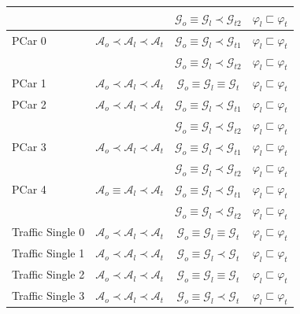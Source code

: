 \begin{table}[h]
\begin{tabular*}{\linewidth}{@{\extracolsep{\fill}}lccc@{}}
 & & $\mathcal{G}_{o}\equiv\mathcal{G}_{l}\prec\mathcal{G}_{t2}$ & $\varphi_l\sqsubset \varphi_t$ \\
\hline
PCar 0 & $\mathcal{A}_{o}\prec\mathcal{A}_{l}\prec\mathcal{A}_{t}$ & $\mathcal{G}_{o}\equiv\mathcal{G}_{l}\prec\mathcal{G}_{t1}$ & $\varphi_l\sqsubset \varphi_t$ \\
 & & $\mathcal{G}_{o}\equiv\mathcal{G}_{l}\prec\mathcal{G}_{t2}$ & $\varphi_l\sqsubset \varphi_t$ \\
PCar 1 & $\mathcal{A}_{o}\prec\mathcal{A}_{l}\prec\mathcal{A}_{t}$ & $\mathcal{G}_{o}\equiv\mathcal{G}_{l}\equiv\mathcal{G}_{t}$ & $\varphi_l\sqsubset \varphi_t$ \\
PCar 2 & $\mathcal{A}_{o}\prec\mathcal{A}_{l}\prec\mathcal{A}_{t}$ & $\mathcal{G}_{o}\equiv\mathcal{G}_{l}\prec\mathcal{G}_{t1}$ & $\varphi_l\sqsubset \varphi_t$ \\
 & & $\mathcal{G}_{o}\equiv\mathcal{G}_{l}\prec\mathcal{G}_{t2}$ & $\varphi_l\sqsubset \varphi_t$ \\
PCar 3 & $\mathcal{A}_{o}\prec\mathcal{A}_{l}\prec\mathcal{A}_{t}$ & $\mathcal{G}_{o}\equiv\mathcal{G}_{l}\prec\mathcal{G}_{t1}$ & $\varphi_l\sqsubset \varphi_t$ \\
 & & $\mathcal{G}_{o}\equiv\mathcal{G}_{l}\prec\mathcal{G}_{t2}$ & $\varphi_l\sqsubset \varphi_t$ \\
PCar 4 & $\mathcal{A}_{o}\equiv\mathcal{A}_{l}\prec\mathcal{A}_{t}$ & $\mathcal{G}_{o}\equiv\mathcal{G}_{l}\prec\mathcal{G}_{t1}$ & $\varphi_l\sqsubset \varphi_t$ \\
 & & $\mathcal{G}_{o}\equiv\mathcal{G}_{l}\prec\mathcal{G}_{t2}$ & $\varphi_l\sqsubset \varphi_t$ \\
\hline
Traffic Single 0 & $\mathcal{A}_{o}\prec\mathcal{A}_{l}\prec\mathcal{A}_{t}$ & $\mathcal{G}_{o}\equiv\mathcal{G}_{l}\equiv\mathcal{G}_{t}$ & $\varphi_l\sqsubset \varphi_t$ \\
Traffic Single 1 & $\mathcal{A}_{o}\prec\mathcal{A}_{l}\prec\mathcal{A}_{t}$ & $\mathcal{G}_{o}\equiv\mathcal{G}_{l}\prec\mathcal{G}_{t}$ & $\varphi_l\sqsubset \varphi_t$ \\
Traffic Single 2 & $\mathcal{A}_{o}\prec\mathcal{A}_{l}\prec\mathcal{A}_{t}$ & $\mathcal{G}_{o}\equiv\mathcal{G}_{l}\equiv\mathcal{G}_{t}$ & $\varphi_l\sqsubset \varphi_t$ \\
Traffic Single 3 & $\mathcal{A}_{o}\prec\mathcal{A}_{l}\prec\mathcal{A}_{t}$ & $\mathcal{G}_{o}\equiv\mathcal{G}_{l}\prec\mathcal{G}_{t}$ & $\varphi_l\sqsubset \varphi_t$ \\

\end{tabular*}
\end{table}
